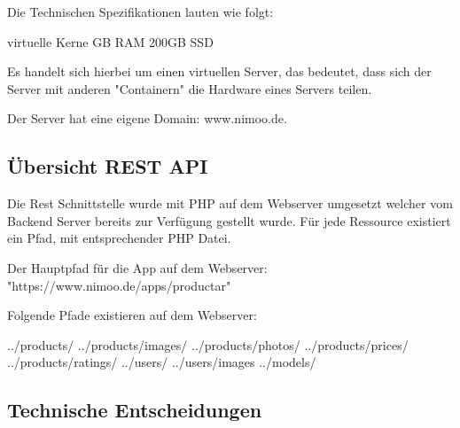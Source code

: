 \documentclass{scrartcl}
\begin{document}
\noindent Die Technischen Spezifikationen lauten wie folgt: \newline 

 virtuelle Kerne \newline
{} GB RAM \newline 
\noindent 200GB SSD \newline 

\noindent Es handelt sich hierbei um einen virtuellen Server, das bedeutet, dass sich der Server mit anderen "Containern" die Hardware eines Servers teilen. %
\newline

\noindent Der Server hat eine eigene Domain: www.nimoo.de. 

\newpage

\subsection{Übersicht REST API}

Die Rest Schnittstelle wurde mit PHP auf dem Webserver umgesetzt welcher vom Backend Server bereits zur Verfügung gestellt wurde. 
Für jede Ressource existiert ein Pfad, mit entsprechender PHP Datei. \newline 

\noindent Der Hauptpfad für die App auf dem Webserver: "https://www.nimoo.de/apps/productar" \newline

\noindent Folgende Pfade existieren auf dem Webserver: \newline

\noindent ../products/ \newline
\noindent ../products/images/ \newline
\noindent ../products/photos/ \newline
\noindent ../products/prices/ \newline
\noindent ../products/ratings/ \newline
\noindent ../users/ \newline
\noindent ../users/images \newline
\noindent ../models/ \newline

\subsection{Technische Entscheidungen}
\end{document}
